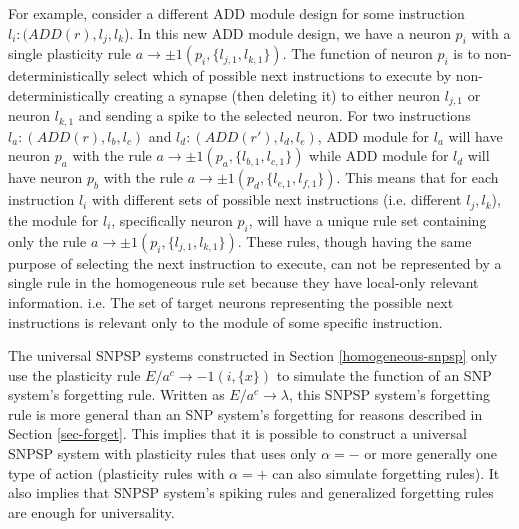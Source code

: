 \documentclass[smallextended]{svjour3}
\begin{document}
For example, consider a different ADD module design for some instruction $l_i: (ADD(r), l_j, l_k$). In this new ADD module design, we have a neuron 
$p_i$ with a single plasticity rule $a \rightarrow \pm1(p_i, \{l_{j,1}, l_{k,1}\})$. The function of neuron $p_i$ is to non-deterministically select 
which of possible next instructions to execute by non-deterministically creating a synapse (then deleting it) to either neuron $l_{j,1}$ or 
neuron $l_{k,1}$ and sending a spike to the selected neuron. For two instructions $l_a: (ADD(r), l_b,l_c)$ and $l_d:(ADD(r'), l_d, l_e)$, ADD module
for $l_a$ will have neuron $p_a$ with the rule $a \rightarrow \pm1(p_a,\{l_{b,1}, l_{c,1}\})$ while ADD module for $l_d$ will have neuron $p_b$ with
the rule $a \rightarrow \pm1(p_d,\{l_{e,1}, l_{f,1}\})$. This means that for each instruction $l_i$ with different sets of possible next instructions 
(i.e. different $l_j, l_k$), the module for $l_i$, specifically neuron $p_i$, will have a unique rule set containing only  the rule $a \rightarrow \pm1(p_i,
\{l_{j,1}, l_{k,1}\})$. These rules, though having the same purpose of selecting the next instruction to execute, can not be represented by a single
rule in the homogeneous rule set because they have local-only relevant information. i.e. The set of target neurons representing the possible next
instructions is relevant only to the module of some specific instruction.

The universal SNPSP systems constructed in Section \ref{homogeneous-snpsp} only use the plasticity rule $E/a^c \rightarrow -1(i,\{x\})$ to simulate
the function of an SNP system's forgetting rule. Written as $E/a^c \rightarrow \lambda$, this SNPSP system's forgetting rule is more general than
an SNP system's forgetting for reasons described in Section \ref{sec-forget}. This implies that it is possible to construct a universal SNPSP system
with plasticity rules that uses only $\alpha = -$ or more generally one type of action (plasticity rules with $\alpha = +$ can also simulate 
forgetting rules). It also implies that SNPSP system's spiking rules and  generalized forgetting rules are enough for universality.
\end{document}
